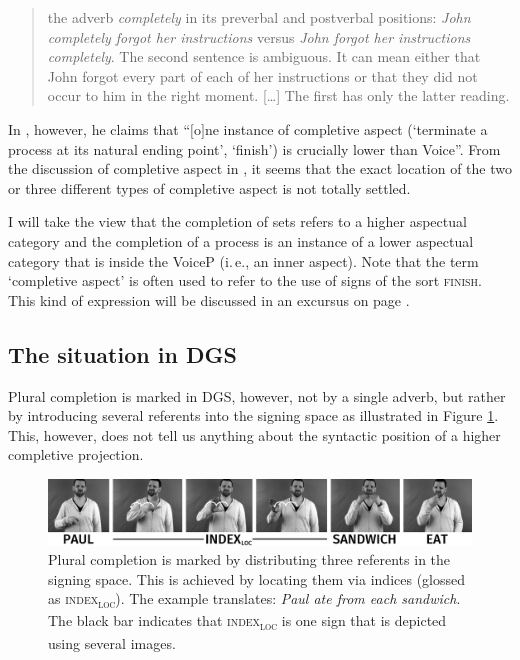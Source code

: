 \begin{quote}
the adverb \textit{completely} in its preverbal and postverbal positions: \textit{John completely forgot her instructions} versus \textit{John forgot her instructions completely}. The second sentence is ambiguous. It can mean either that John forgot every part of each of her instructions or that they did not occur to him in the right moment. [\dots ] The first has only the latter reading.
\end{quote}


\noindent In \citet[69]{cinque2006restructuring}, however, he claims that ``$[$o$]$ne instance of completive aspect (`terminate a process at its natural ending point', `finish') is crucially lower than Voice''. From the discussion of completive aspect in \citet{cinque2006restructuring}, it seems that the exact location of the two or three different types of completive aspect is not totally settled. 

I will take the view that the completion of sets refers to a higher aspectual category and the completion of a process is an instance of a lower aspectual category that is inside the VoiceP (i.\,e., an inner aspect). Note that the term `completive aspect' is often used to refer to the use of signs of the sort \textsc{finish}. This kind of expression will be discussed in an excursus on page \pageref{exkursfertigdurch}.

\subsection{The situation in DGS}
Plural completion is marked in DGS, however, not by a single adverb, but rather by introducing several referents into the signing space as illustrated in Figure \ref{fig:completiveonedgs}. This, however, does not tell us anything about the syntactic position of a higher completive projection. 


\begin{figure}[bt]
\centering
	\includegraphics[width=1.0\textwidth]{completivesw.jpg}
	\caption{Plural completion is marked by distributing three referents in the signing space. This is achieved by locating them via indices (glossed as \textsc{index}\textsubscript{\textsc{loc}}). The example translates: \textit{Paul ate from each sandwich}. The black bar indicates that \textsc{index\textsubscript{loc}} is one sign that is depicted using several images.}
	\label{fig:completiveonedgs}
\end{figure}

